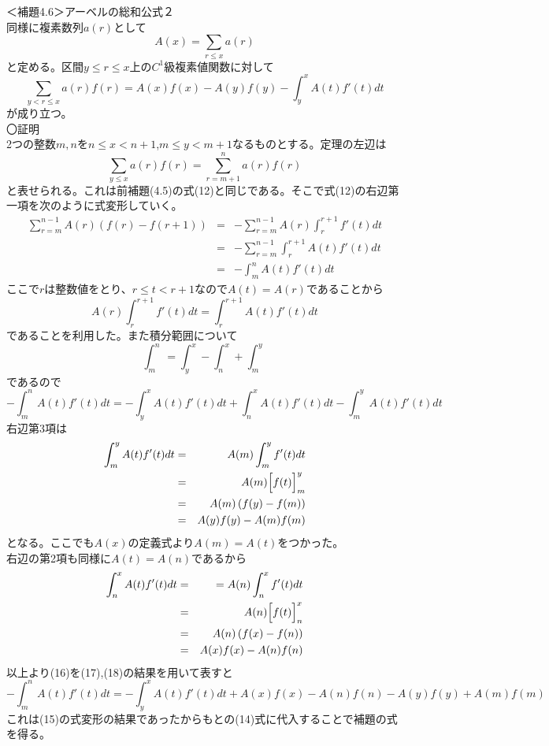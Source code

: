 \documentclass{jsarticle}
\begin{document}
＜補題4.6＞アーベルの総和公式２\\
同様に複素数列\(a(r)\)として\\
\begin{equation}
A(x)=\sum_{r\leq x}a(r)
\end{equation}
と定める。区間\(y\leq r\leq x\)上の\(C^{1}\)級複素値関数に対して
\begin{equation}
\sum_{y<r\leq x}a(r)f(r)=A(x)f(x)-A(y)f(y)-\int_{y}^{x}A(t)f'(t)dt
\end{equation}
が成り立つ。\\
〇証明\\
2つの整数\(m,n\)を\(n\leq x<n+1\),\(m\leq y<m+1\)なるものとする。定理の左辺は
\[\sum_{y\leq x}a(r)f(r)=\sum_{r=m+1}^{n}a(r)f(r)\]
と表せられる。これは前補題(4.5)の式(12)と同じである。そこで式(12)の右辺第一項を次のように式変形していく。
\begin{eqnarray}
\sum_{r=m}^{n-1}A(r)\left(f(r)-f(r+1)\right)&=&-\sum_{r=m}^{n-1}A(r)\int_{r}^{r+1}f'(t)dt\\
&=&-\sum_{r=m}^{n-1}\int_{r}^{r+1}A(t)f'(t)dt\nonumber\\
&=&-\int_{m}^{n}A(t)f'(t)dt\nonumber
\end{eqnarray}
ここで\(r\)は整数値をとり、\(r\leq t<r+1\)なので\(A(t)=A(r)\)であることから
\[A(r)\int_{r}^{r+1}f'(t)dt=\int_{r}^{r+1}A(t)f'(t)dt\]
であることを利用した。また積分範囲について
\[
\int_{m}^{n}=\int_{y}^{x}-\int_{n}^{x}+\int_{m}^{y}
\]
であるので
\begin{equation}
-\int_{m}^{n}A(t)f'(t)dt=-\int_{y}^{x}A(t)f'(t)dt+\int_{n}^{x}A(t)f'(t)dt-\int_{m}^{y}A(t)f'(t)dt
\end{equation}
右辺第3項は
\begin{eqnarray}
\int_{m}^{y}A(t)f'(t)dt &=& A(m)\int_{m}^{y}f'(t)dt\nonumber\\
&=&A (m)\Bigl[f(t)\Bigr]_{m}^{y}\nonumber\\
&=&A (m)\left(f(y)-f(m)\right)\nonumber\\
&=& A(y)f(y)-A(m)f(m)
\end{eqnarray}
となる。ここでも\(A(x)\)の定義式より\(A(m)=A(t)\)をつかった。\\
右辺の第2項も同様に\(A(t)=A(n)\)であるから
\begin{eqnarray}
\int_{n}^{x}A(t)f'(t)dt&=&=A(n)\int_{n}^{x}f'(t)dt\nonumber\\
&=&A(n)\Bigl[f(t)\Bigr]_{n}^{x}\nonumber\\
&=&A(n)\left(f(x)-f(n)\right)\nonumber\\
&=&A(x)f(x)-A(n)f(n)
\end{eqnarray}
以上より(16)を(17),(18)の結果を用いて表すと
\[
-\int_{m}^{n}A(t)f'(t)dt=-\int_{y}^{x}A(t)f'(t)dt+A(x)f(x)-A(n)f(n)-A(y)f(y)+A(m)f(m)
\]
これは(15)の式変形の結果であったからもとの(14)式に代入することで補題の式を得る。
\\
\end{document}
